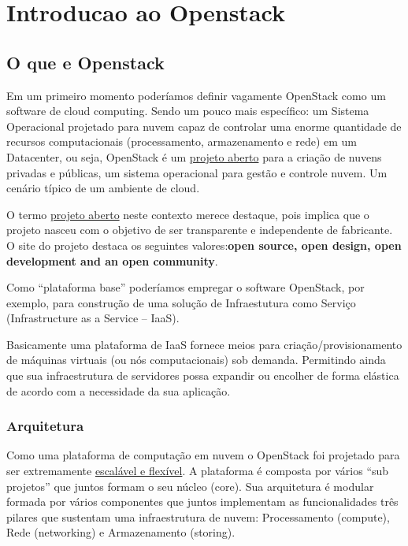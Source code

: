 \documentclass[a4paper]{book}
\begin{document}

	\chapter{Introducao ao Openstack}
	\section{O que e Openstack}
	\justify
	
					Em um primeiro momento poderíamos definir vagamente OpenStack como um software de 			cloud computing. Sendo um pouco mais específico: um Sistema Operacional projetado 			para nuvem capaz de controlar uma enorme quantidade de recursos computacionais 				(processamento, armazenamento e rede) em um Datacenter, ou seja, OpenStack é um 				\underline{projeto aberto} para a criação de nuvens privadas e públicas, 		um 				sistema 			operacional para gestão e controle nuvem. Um cenário típico de 				um ambiente de 				cloud.	
		
		O termo \underline{projeto aberto} neste contexto merece destaque, pois implica 				que o projeto nasceu com o objetivo de ser transparente e independente de 					fabricante. O site do projeto destaca os seguintes valores:\textbf{open source, 				open design, open development and an open community}.
		
		Como “plataforma base” poderíamos empregar o software OpenStack, por exemplo, para 		construção de uma solução de Infraestutura como Serviço (Infrastructure as a 					Service – IaaS).	
		
		Basicamente uma plataforma de IaaS fornece meios para criação/provisionamento de 				máquinas virtuais (ou nós computacionais) sob demanda. Permitindo ainda que sua 				infraestrutura de servidores possa expandir ou encolher de forma elástica de 					acordo com a necessidade da sua aplicação.
		
		
		\subsection{Arquitetura}
			Como uma plataforma de computação em nuvem o OpenStack foi projetado para ser 				extremamente \underline{escalável e flexível}. A plataforma é composta por 					vários “sub projetos” que juntos formam o seu núcleo (core).  Sua arquitetura 				é modular formada por vários componentes que juntos implementam as 							funcionalidades 	três pilares que sustentam uma infraestrutura de nuvem: 						Processamento (compute), Rede (networking) e  Armazenamento (storing).
\end{document}
